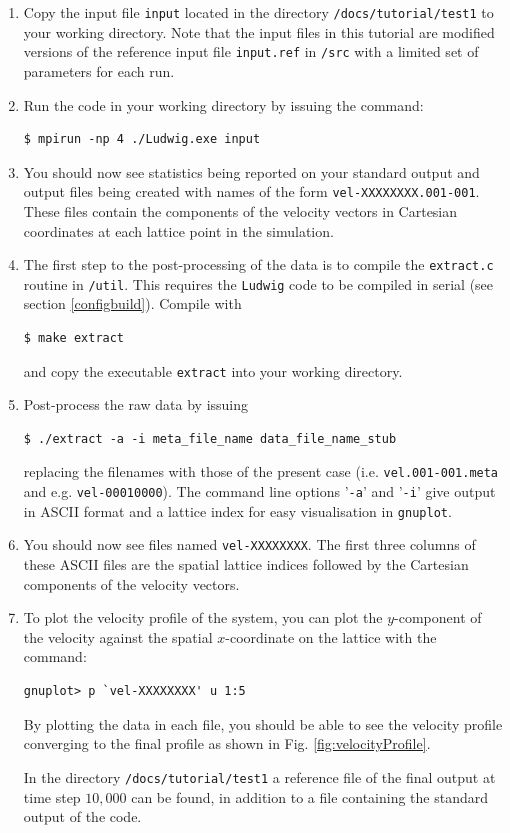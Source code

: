 \documentclass[11pt,twoside,a4paper]{article}
\begin{document}
\begin{enumerate}
\item Copy the input file \texttt{input} located in the directory \texttt{/docs/tutorial/test1} 
to your working directory. Note that the input files in this tutorial are modified versions of the 
reference input file \texttt{input.ref} in \texttt{/src} with a limited set of parameters
for each run.
\item Run the code in your working directory by issuing the command:
\begin{lstlisting}
$ mpirun -np 4 ./Ludwig.exe input
\end{lstlisting}

\item You should now see statistics being reported on your standard output and 
output files being created with names of the form \texttt{vel-XXXXXXXX.001-001}. 
These files contain the components of the velocity vectors in Cartesian coordinates at each lattice point in the simulation. 
\item The first step to the post-processing of the data is to compile the \texttt{extract.c} 
routine in \texttt{/util}. This requires the \texttt{Ludwig} code to be compiled in serial 
(see section \ref{configbuild}). Compile with 
\begin{lstlisting}
$ make extract 
\end{lstlisting} 
and copy the executable \texttt{extract} into your working directory.
\item Post-process the raw data by issuing 
\begin{lstlisting}
$ ./extract -a -i meta_file_name data_file_name_stub
\end{lstlisting} 
replacing the filenames with those of the present case (i.e. \texttt{vel.001-001.meta} and e.g. \texttt{vel-00010000}).
The command line options '\texttt{-a}' and '\texttt{-i}' give output in ASCII format and a lattice index 
for easy visualisation in \texttt{gnuplot}.

\item You should now see files named \texttt{vel-XXXXXXXX}.  The first three columns of these ASCII files are the spatial lattice indices followed by the Cartesian components of the velocity vectors.\\
\item To plot the velocity profile of the system, you can plot the $y$-component of the velocity against 
the spatial $x$-coordinate on the lattice with the command:
\begin{lstlisting}
gnuplot> p `vel-XXXXXXXX' u 1:5
\end{lstlisting} 
By plotting the data in each file, you should be able to see the velocity profile converging to the final profile as shown in Fig. \ref{fig:velocityProfile}. 

In the directory \texttt{/docs/tutorial/test1} a reference file of the final 
output at time step $10,000$ can be found, in addition to a file containing the standard output of the code.
\end{enumerate} 
\end{document}
